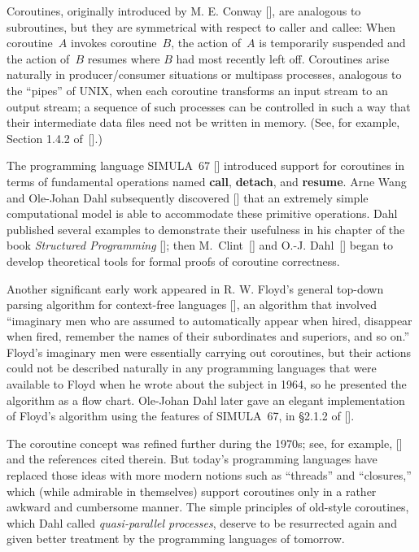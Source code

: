 Coroutines, originally introduced by M. E. Conway [\Conway], are analogous to
subroutines, but they are symmetrical with respect
to caller and callee: When coroutine~$A$ invokes coroutine~$B$, the action
of~$A$ is temporarily suspended and the action of~$B$ resumes where $B$ had
most recently left off. Coroutines arise naturally in producer/consumer
situations or multipass processes, analogous to the ``pipes'' of {\mc UNIX},
when each coroutine transforms an input stream to an output stream; a
sequence of such processes can be controlled in such a way that their
intermediate data files need not be written in memory.
(See, for example, Section 1.4.2 of~[\Ki].)

The programming language {\mc SIMULA~67} [\Sbase] introduced support for
coroutines in terms of fundamental operations named
{\bf call}, {\bf detach}, and
{\bf resume}. Arne Wang and Ole-Johan Dahl subsequently discovered [\WD] that
an extremely simple computational model is able to accommodate these
primitive operations. Dahl published several examples to demonstrate their
usefulness in his chapter of the book {\sl Structured Programming\/} [\SP];
then M.~Clint~[\Clint] and O.-J. Dahl~[\Dsemi] began to develop theoretical
tools for formal proofs of coroutine correctness.

Another significant early work appeared in R. W. Floyd's general top-down
parsing algorithm for context-free languages [\Floyd], an algorithm that
involved ``imaginary men who are assumed to automatically appear when hired,
disappear when fired, remember the names of their subordinates and superiors,
and so on.'' Floyd's imaginary men were essentially carrying out coroutines,
but their actions could not be described naturally in any programming
languages that were available to Floyd when he wrote about the subject in
1964, so he presented the algorithm as a flow chart.
Ole-Johan Dahl later gave an elegant implementation of Floyd's algorithm
using the features of {\mc SIMULA~67}, in \S2.1.2 of [\Dsyn].

The coroutine concept was refined further during the 1970s; see, for example,
[\VM] and the references cited therein. But today's programming languages
have replaced those ideas with more modern notions such as ``threads'' and
``closures,'' which (while admirable in themselves) support coroutines only
in a rather awkward and cumbersome manner. The simple principles of old-style
coroutines, which Dahl called {\it quasi-parallel processes}, deserve to be
resurrected again and given better treatment by the programming languages of
tomorrow.


